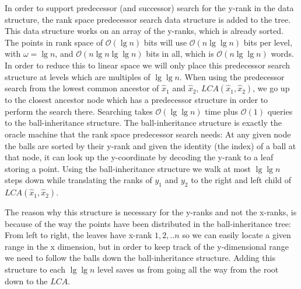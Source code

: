 In order to support predecessor (and successor) search for the y-rank in the data structure, the rank space predecessor search data structure is added to the tree. This data structure works on an array of the y-ranks, which is already sorted. The points in rank space of $\mathcal{O}(\lg n)$ bits will use $\mathcal{O}(n \lg \lg n)$ bits per level, with $\omega = \lg n$, and $\mathcal{O}(n \lg n \lg \lg n)$ bits in all, which is $\mathcal{O}(n \lg \lg n)$ words. In order to reduce this to linear space we will only place this predecessor search structure at levels which are multiples of $\lg \lg n$. When using the predecessor search from the lowest common ancestor of $\hat{x}_1$ and $\hat{x}_2$, $LCA(\hat{x}_1, \hat{x}_2)$, we go up to the closest ancestor node which has a predecessor structure in order to perform the search there. Searching takes $\mathcal{O}(\lg \lg n)$ time plus $\mathcal{O}(1)$ queries to the ball-inheritance structure. The ball-inheritance structure is exactly the oracle machine that the rank space predecessor search needs: At any given node the balls are sorted by their y-rank and given the identity (the index) of a ball at that node, it can look up the y-coordinate by decoding the y-rank to a leaf storing a point. Using the ball-inheritance structure we walk at most $\lg \lg n$ steps down while translating the ranks of $y_1$ and $y_2$ to the right and left child of $LCA(\hat{x}_1, \hat{x}_2)$. 

The reason why this structure is necessary for the y-ranks and not the x-ranks, is because of the way the points have been distributed in the ball-inheritance tree: From left to right, the leaves have x-rank $1,2,..n$ so we can easily locate a given range in the x dimension, but in order to keep track of the y-dimensional range we need to follow the balls down the ball-inheritance structure. Adding this structure to each $\lg \lg n$ level saves us from going all the way from the root down to the $LCA$. \\

